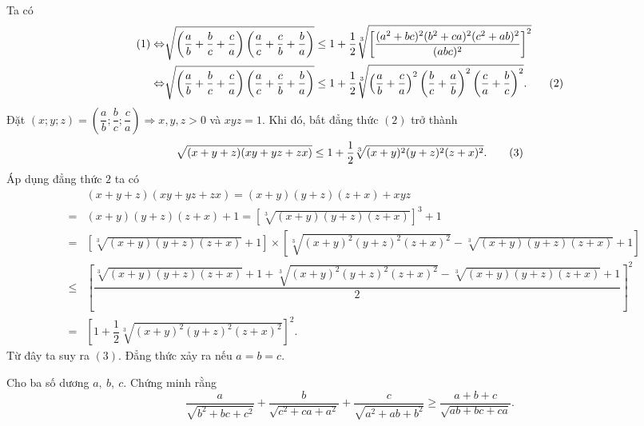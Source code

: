{\begin{bt}
{\[		\]
		Ta có
		\begin{align}
		(1)\Leftrightarrow&\sqrt{\left(\dfrac{a}{b}+\dfrac{b}{c}+\dfrac{c}{a}\right)\left(\dfrac{a}{c}+\dfrac{c}{b}+\dfrac{b}{a}\right)}\leq 1+\dfrac{1}{2}\sqrt[3]{\left[\dfrac{(a^{2}+bc)^{2}(b^{2}+ca)^{2}(c^{2}+ab)^{2}}{(abc)^{2}}\right]^{2}}\notag\\
		\Leftrightarrow&\sqrt{\left(\dfrac{a}{b}+\dfrac{b}{c}+\dfrac{c}{a}\right)\left(\dfrac{a}{c}+\dfrac{c}{b}+\dfrac{b}{a}\right)}\leq 1+\dfrac{1}{2}\sqrt[3]{\left(\dfrac{a}{b}+\dfrac{c}{a}\right)^{2}\left(\dfrac{b}{c}+\dfrac{a}{b}\right)^{2}\left(\dfrac{c}{a}+\dfrac{b}{c}\right)^{2}}.\hfill\tag{2}
		\end{align}
		Đặt $ (x;y;z)=\left(\dfrac{a}{b};\dfrac{b}{c};\dfrac{c}{a}\right)\Rightarrow x,y,z>0 $ và $ xyz=1 $. Khi đó, bất đẳng thức $ (2) $ trở thành
		\[ 
		\sqrt{(x+y+z)(xy+yz+zx)}\leq 1+\dfrac{1}{2}\sqrt[3]{(x+y)^{2}(y+z)^{2}(z+x)^{2}}.\hfill\tag{3}
		\]
		Áp dụng đẳng thức $ 2 $ ta có
		\begin{eqnarray*}
			&&(x+y+z)(xy+yz+zx)=(x+y)(y+z)(z+x)+xyz\\
			&=&(x+y)(y+z)(z+x)+1=\left[\sqrt[3]{(x+y)(y+z)(z+x)}\right]^{3}+1\\
			&=&\left[\sqrt[3]{(x+y)(y+z)(z+x)}+1\right]\times\left[\sqrt[3]{(x+y)^{2}(y+z)^{2}(z+x)^{2}}-\sqrt[3]{(x+y)(y+z)(z+x)}+1\right]\\
			&\leq&\left[\dfrac{\sqrt[3]{(x+y)(y+z)(z+x)}+1+\sqrt[3]{(x+y)^{2}(y+z)^{2}(z+x)^{2}}-\sqrt[3]{(x+y)(y+z)(z+x)}+1}{2}\right]^{2}\\
			&=&\left[1+\dfrac{1}{2}\sqrt[3]{(x+y)^{2}(y+z)^{2}(z+x)^{2}}\right]^{2}.
		\end{eqnarray*}
		Từ đây ta suy ra $ (3) $. Đẳng thức xảy ra nếu $ a=b=c $.
	}
\end{bt}
\begin{bt}%
	Cho ba số dương $ a,\ b,\ c $. Chứng minh rằng
	\[ 
	\dfrac{a}{\sqrt{b^{2}+bc+c^{2}}}+\dfrac{b}{\sqrt{c^{2}+ca+a^{2}}}+\dfrac{c}{\sqrt{a^{2}+ab+b^{2}}}\geq \dfrac{a+b+c}{\sqrt{ab+bc+ca}}.
	\]
\end{bt}}
